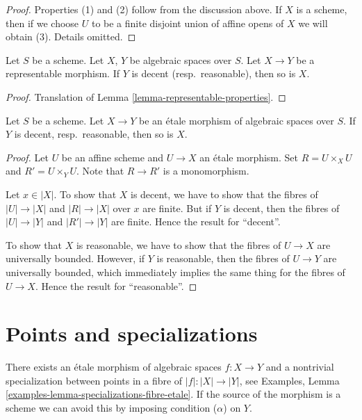 \begin{proof}
\medskip\noindent
Properties (1) and (2) follow from the discussion above.
If $X$ is a scheme, then if we choose $U$ to be a finite
disjoint union of affine opens of $X$ we will obtain (3).
Details omitted.
\end{proof}

\begin{lemma}
\label{lemma-representable-named-properties}
Let $S$ be a scheme. Let $X$, $Y$ be algebraic spaces over $S$.
Let $X \to Y$ be a representable morphism.
If $Y$ is decent (resp.\ reasonable), then so is $X$.
\end{lemma}

\begin{proof}
Translation of Lemma \ref{lemma-representable-properties}.
\end{proof}

\begin{lemma}
\label{lemma-etale-named-properties}
Let $S$ be a scheme. Let $X \to Y$ be an \'etale morphism of
algebraic spaces over $S$. If $Y$ is decent, resp.\ reasonable,
then so is $X$.
\end{lemma}

\begin{proof}
Let $U$ be an affine scheme and $U \to X$ an \'etale morphism.
Set $R = U \times_X U$ and $R' = U \times_Y U$. Note that
$R \to R'$ is a monomorphism.

\medskip\noindent
Let $x \in |X|$. To show that $X$ is decent, we have to show that
the fibres of $|U| \to |X|$ and $|R| \to |X|$ over $x$ are finite.
But if $Y$ is decent, then the fibres of $|U| \to |Y|$ and
$|R'| \to |Y|$ are finite. Hence the result for ``decent''.

\medskip\noindent
To show that $X$ is reasonable, we have to show that the fibres of
$U \to X$ are universally bounded. However, if $Y$ is reasonable,
then the fibres of $U \to Y$ are universally bounded, which immediately
implies the same thing for the fibres of $U \to X$.
Hence the result for ``reasonable''.
\end{proof}







\section{Points and specializations}
\label{section-specializations}

\noindent
There exists an \'etale morphism of algebraic spaces $f : X \to Y$
and a nontrivial specialization between points in a fibre of
$|f| : |X| \to |Y|$, see
Examples, Lemma \ref{examples-lemma-specializations-fibre-etale}.
If the source of the morphism is a scheme we can avoid this by
imposing condition ($\alpha$) on $Y$.

